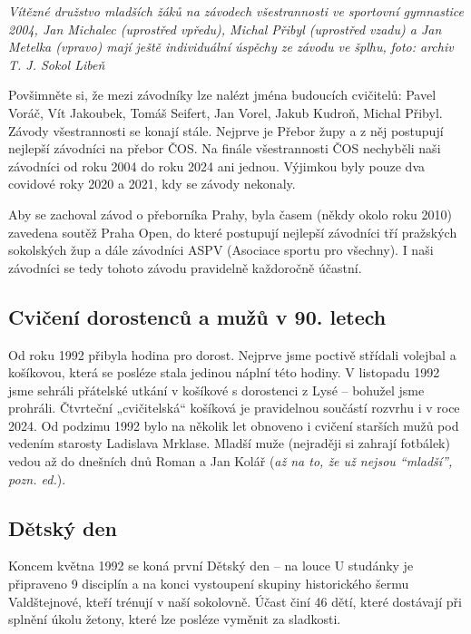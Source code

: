 \emph{Vítězné družstvo mladších žáků na závodech všestrannosti ve
sportovní gymnastice 2004, Jan Michalec (uprostřed vpředu), Michal
Přibyl (uprostřed vzadu) a Jan Metelka (vpravo) mají ještě individuální
úspěchy ze závodu ve šplhu,} \emph{foto: archiv T. J. Sokol Libeň}

Povšimněte si, že mezi závodníky lze nalézt jména budoucích cvičitelů:
Pavel Voráč, Vít Jakoubek, Tomáš Seifert, Jan Vorel, Jakub Kudroň,
Michal Přibyl. Závody všestrannosti se konají stále. Nejprve je Přebor
župy a z něj postupují nejlepší závodníci na přebor ČOS. Na finále
všestrannosti ČOS nechyběli naši závodníci od roku 2004 do roku 2024 ani
jednou. Výjimkou byly pouze dva covidové roky 2020 a 2021, kdy se závody
nekonaly.

Aby se zachoval závod o přeborníka Prahy, byla časem (někdy okolo roku
2010) zavedena soutěž Praha Open, do které postupují nejlepší závodníci
tří pražských sokolských žup a dále závodníci ASPV (Asociace sportu pro
všechny). I naši závodníci se tedy tohoto závodu pravidelně každoročně
účastní.

\subsection{Cvičení dorostenců a mužů v 90.
letech}\label{cviux10denuxed-dorostencux16f-a-muux17eux16f-v-90.-letech}

Od roku 1992 přibyla hodina pro dorost. Nejprve jsme poctivě střídali
volejbal a košíkovou, která se posléze stala jedinou náplní této hodiny.
V listopadu 1992 jsme sehráli přátelské utkání v košíkové s dorostenci z
Lysé -- bohužel jsme prohráli. Čtvrteční „cvičitelská`` košíková je
pravidelnou součástí rozvrhu i v roce 2024. Od podzimu 1992 bylo na
několik let obnoveno i cvičení starších mužů pod vedením starosty
Ladislava Mrklase. Mladší muže (nejraději si zahrají fotbálek) vedou až
do dnešních dnů Roman a Jan Kolář (\emph{až na to, že už nejsou
``mladší'', pozn. ed.}).

\subsection{Dětský den}\label{dux11btskuxfd-den}

Koncem května 1992 se koná první Dětský den -- na louce U studánky je
připraveno 9 disciplín a na konci vystoupení skupiny historického šermu
Valdštejnové, kteří trénují v naší sokolovně. Účast činí 46 dětí, které
dostávají při splnění úkolu žetony, které lze posléze vyměnit za
sladkosti.


